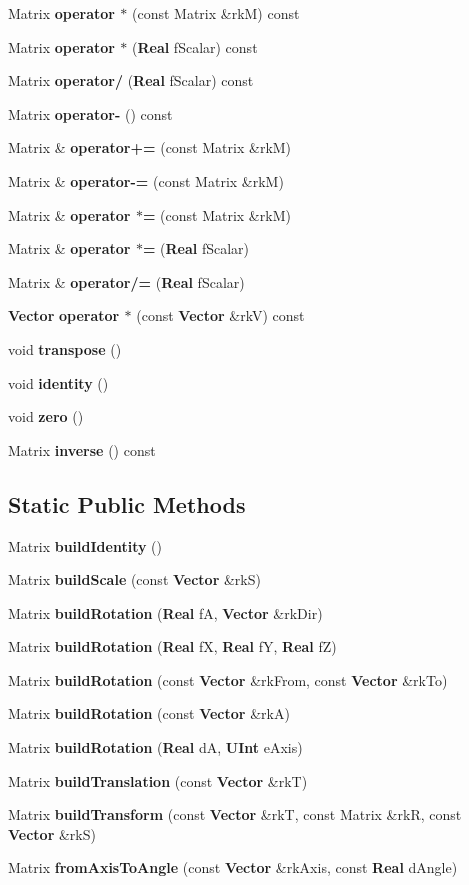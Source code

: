 \begin{CompactItemize}
$$\item 
Matrix {\bf operator $\ast$} (const Matrix \&rk\-M) const
\item 
Matrix {\bf operator $\ast$} ({\bf Real} f\-Scalar) const
\item 
Matrix {\bf operator/} ({\bf Real} f\-Scalar) const
\item 
Matrix {\bf operator-} () const
\item 
Matrix \& {\bf operator+=} (const Matrix \&rk\-M)
\item 
Matrix \& {\bf operator-=} (const Matrix \&rk\-M)
\item 
Matrix \& {\bf operator $\ast$=} (const Matrix \&rk\-M)
\item 
Matrix \& {\bf operator $\ast$=} ({\bf Real} f\-Scalar)
\item 
Matrix \& {\bf operator/=} ({\bf Real} f\-Scalar)
\item 
{\bf Vector} {\bf operator $\ast$} (const {\bf Vector} \&rk\-V) const
\item 
void {\bf transpose} ()
\item 
void {\bf identity} ()
\item 
void {\bf zero} ()
\item 
Matrix {\bf inverse} () const
\end{CompactItemize}
\subsection*{Static Public Methods}
\begin{CompactItemize}
\item 
Matrix {\bf build\-Identity} ()
\item 
Matrix {\bf build\-Scale} (const {\bf Vector} \&rk\-S)
\item 
Matrix {\bf build\-Rotation} ({\bf Real} f\-A, {\bf Vector} \&rk\-Dir)
\item 
Matrix {\bf build\-Rotation} ({\bf Real} f\-X, {\bf Real} f\-Y, {\bf Real} f\-Z)
\item 
Matrix {\bf build\-Rotation} (const {\bf Vector} \&rk\-From, const {\bf Vector} \&rk\-To)
\item 
Matrix {\bf build\-Rotation} (const {\bf Vector} \&rk\-A)
\item 
Matrix {\bf build\-Rotation} ({\bf Real} d\-A, {\bf UInt} e\-Axis)
\item 
Matrix {\bf build\-Translation} (const {\bf Vector} \&rk\-T)
\item 
Matrix {\bf build\-Transform} (const {\bf Vector} \&rk\-T, const Matrix \&rk\-R, const {\bf Vector} \&rk\-S)
\item 
Matrix {\bf from\-Axis\-To\-Angle} (const {\bf Vector} \&rk\-Axis, const {\bf Real} d\-Angle)
\end{CompactItemize}
